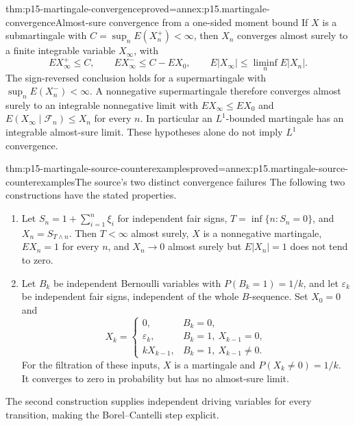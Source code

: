 \begin{hbtheorem}{thm:p15-martingale-convergence}{proved=annex:p15.martingale-convergence}{Almost-sure convergence from a one-sided moment bound}
If \(X\) is a submartingale with \(C=\sup_nE(X_n^+)<\infty\),
then \(X_n\) converges almost surely to a finite integrable variable \(X_\infty\),
with
\[
              EX_\infty^+\leq C,\qquad
              EX_\infty^-\leq C-EX_0,\qquad
              E|X_\infty|\leq\liminf_nE|X_n|.
\]
The sign-reversed conclusion holds for a supermartingale with
\(\sup_nE(X_n^-)<\infty\).
A nonnegative supermartingale therefore converges almost surely to
an integrable nonnegative limit with \(EX_\infty\leq EX_0\) and
\(E(X_\infty\mid\mathcal F_n)\leq X_n\) for every \(n\).
In particular an \(L^1\)-bounded martingale has an integrable
almost-sure limit. These hypotheses alone do not imply \(L^1\) convergence.
\end{hbtheorem}

\begin{hbtheorem}{thm:p15-martingale-source-counterexamples}{proved=annex:p15.martingale-source-counterexamples}{The source's two distinct convergence failures}
The following two constructions have the stated properties.
\begin{enumerate}
\item Let \(S_n=1+\sum_{i=1}^n\xi_i\) for independent fair signs,
      \(T=\inf\{n:S_n=0\}\), and \(X_n=S_{T\wedge n}\).
      Then \(T<\infty\) almost surely, \(X\) is a nonnegative martingale,
      \(EX_n=1\) for every \(n\), and \(X_n\to0\) almost surely but
      \(E|X_n|=1\) does not tend to zero.
\item Let \(B_k\) be independent Bernoulli variables with \(P(B_k=1)=1/k\),
      and let \(\varepsilon_k\) be independent fair signs, independent
      of the whole \(B\)-sequence. Set \(X_0=0\) and
      \[
      X_k=
      \begin{cases}
       0,&B_k=0,\\
       \varepsilon_k,&B_k=1,\ X_{k-1}=0,\\
       kX_{k-1},&B_k=1,\ X_{k-1}\ne0 .
      \end{cases}
      \]
      For the filtration of these inputs, \(X\) is a martingale and
      \(P(X_k\ne0)=1/k\). It converges to zero in probability but
      has no almost-sure limit.
\end{enumerate}
The second construction supplies independent driving variables for
every transition, making the Borel--Cantelli step explicit.
\end{hbtheorem}

